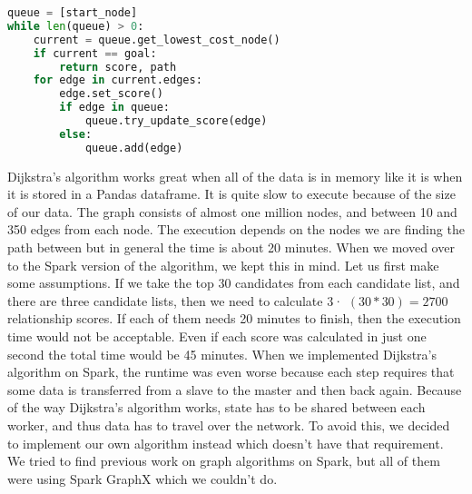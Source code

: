 \begin{lstlisting}[language=Python, caption=Dijkstra pseudocode, label=CodeDijkstra, breaklines=true]
queue = [start_node]
while len(queue) > 0:
    current = queue.get_lowest_cost_node()
    if current == goal:
        return score, path
    for edge in current.edges:
        edge.set_score()
        if edge in queue:
            queue.try_update_score(edge)
        else:
            queue.add(edge)
\end{lstlisting}

Dijkstra's algorithm works great when all of the data is in memory like it is when it is stored in a Pandas dataframe. It is quite slow to execute because of the size of our data. The graph consists of almost one million nodes, and between 10 and 350 edges from each node. The execution depends on the nodes we are finding the path between but in general the time is about 20 minutes. When we moved over to the Spark version of the algorithm, we kept this in mind. Let us first make some assumptions. If we take the top 30 candidates from each candidate list, and there are three candidate lists, then we need to calculate 3· $(30*30)=2700$ relationship scores. If each of them needs 20 minutes to finish, then the execution time would not be acceptable. Even if each score was calculated in just one second the total time would be 45 minutes. When we implemented Dijkstra's algorithm on Spark, the runtime was even worse because each step requires that some data is transferred from a slave to the master and then back again. Because of the way Dijkstra's algorithm works, state has to be shared between each worker, and thus data has to travel over the network. To avoid this, we decided to implement our own algorithm instead which doesn’t have that requirement. We tried to find previous work on graph algorithms on Spark, but all of them were using Spark GraphX which we couldn’t do.

